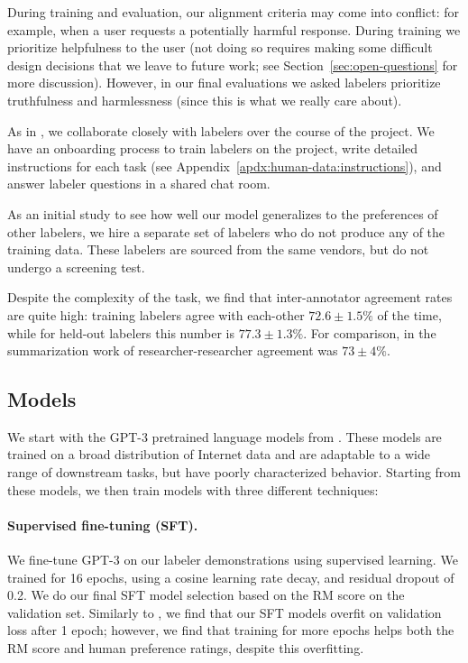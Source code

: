 During training and evaluation, our alignment criteria may come into conflict: for example, when a user requests a potentially harmful response. During training we prioritize helpfulness to the user (not doing so requires making some difficult design decisions that we leave to future work; see Section~\ref{sec:open-questions} for more discussion). However, in our final evaluations we asked labelers prioritize truthfulness and harmlessness (since this is what we really care about). 

As in \citet{stiennon2020learning}, we collaborate closely with labelers over the course of the project. We have an onboarding process to train labelers on the project, write detailed instructions for each task (see Appendix~\ref{apdx:human-data:instructions}), and answer labeler questions in a shared chat room.

As an initial study to see how well our model generalizes to the preferences of other labelers, we hire a separate set of labelers who do not produce any of the training data. These labelers are sourced from the same vendors, but do not undergo a screening test. 

Despite the complexity of the task, we find that inter-annotator agreement rates are quite high: training labelers agree with each-other $72.6 \pm 1.5\%$ of the time, while for held-out labelers this number is $77.3 \pm 1.3\%$. For comparison, in the summarization work of \citet{stiennon2020learning} researcher-researcher agreement was $73 \pm 4\%$.


\subsection{Models}
\label{sec:models}

We start with the GPT-3 pretrained language models from \citet{brown2020language}. These models are trained on a broad distribution of Internet data and are adaptable to a wide range of downstream tasks, but have poorly characterized behavior. Starting from these models, we then train models with three different techniques:

\paragraph{Supervised fine-tuning (SFT).} We fine-tune GPT-3 on our labeler demonstrations using supervised learning.  We trained for 16 epochs, using a cosine learning rate decay, and residual dropout of 0.2. We do our final SFT model selection based on the RM score on the validation set. Similarly to \citet{wu2021recursively}, we find that our SFT models overfit on validation loss after 1 epoch; however, we find that training for more epochs helps both the RM score and human preference ratings, despite this overfitting.


